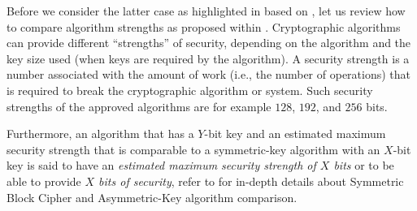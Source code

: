 Before we consider the latter case as highlighted in  based on \cite{Sma10}, let us review how to compare algorithm strengths as proposed within \cite{NIST80057}. Cryptographic algorithms can provide different “strengths” of security, depending on the algorithm and the key size used (when keys are required by the algorithm). A security strength is a number associated with the amount of work (i.e., the number of operations) that is required to break the cryptographic algorithm or system. Such security strengths of the approved algorithms are for example  $128$, $192$, and $256$ bits. 

Furthermore, an algorithm that has a $Y$-bit key and an estimated maximum security strength that is comparable to a symmetric-key algorithm with an $X$-bit key is said to have an \textit{estimated maximum security strength of $X$ bits} or to be able to provide \textit{$X$ bits of security}, refer to \cite{NIST80057} for in-depth details about Symmetric Block Cipher and Asymmetric-Key algorithm comparison.

\begin{table}[h!]
	\centering
	\caption{Comparison of fields size based on keysize equivalence according to \cite{Sma10, NIST80057}}
	\label{tab:ch1.securitylevelsandfieldsize}
\end{table}

